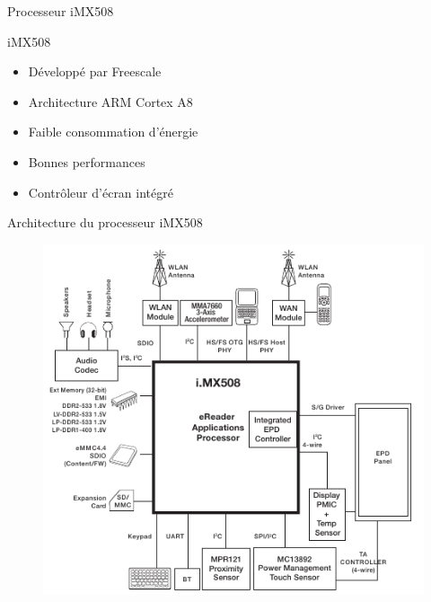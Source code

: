 \begin{frame}{Processeur iMX508} %
	\begin{block}{iMX508}
	\begin{itemize}
		\item{Développé par Freescale}
		\item{Architecture ARM Cortex A8}
		\item{Faible consommation d'énergie}
		\item{Bonnes performances}
		\item{Contrôleur d'écran intégré}
	\end{itemize}
	\end{block}
\end{frame}

\begin{frame}{Architecture du processeur iMX508} %
	\begin{figure}
		\begin{center}
			\includegraphics[scale=0.5]{iMX508.png}
		\end{center}
	\end{figure}
\end{frame}

